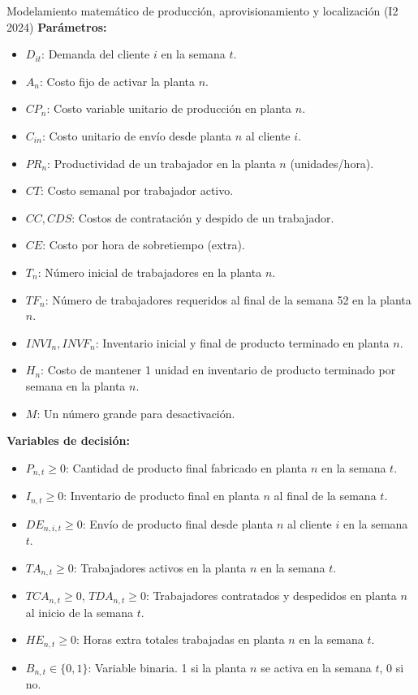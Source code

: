 \begin{ejercicio}{Modelamiento matemático de producción, aprovisionamiento y localización (I2 2024)}
\textbf{Parámetros:}
\begin{itemize}[leftmargin=1.4em, itemsep=0pt]
  \item $D_{it}$: Demanda del cliente $i$ en la semana $t$.
  \item $A_n$: Costo fijo de activar la planta $n$.
  \item $CP_n$: Costo variable unitario de producción en planta $n$.
  \item $C_{in}$: Costo unitario de envío desde planta $n$ al cliente $i$.
  \item $PR_n$: Productividad de un trabajador en la planta $n$ (unidades/hora).
  \item $CT$: Costo semanal por trabajador activo.
  \item $CC, CDS$: Costos de contratación y despido de un trabajador.
  \item $CE$: Costo por hora de sobretiempo (extra).
  \item $T_n$: Número inicial de trabajadores en la planta $n$.
  \item $TF_n$: Número de trabajadores requeridos al final de la semana 52 en la planta $n$.
  \item $INVI_n, INVF_n$: Inventario inicial y final de producto terminado en planta $n$.
  \item $H_n$: Costo de mantener 1 unidad en inventario de producto terminado por semana en la planta $n$.
  \item $M$: Un número grande para desactivación.
\end{itemize}

\textbf{Variables de decisión:}
\begin{itemize}[leftmargin=1.4em, itemsep=0pt]
  \item $P_{n,t} \ge 0$: Cantidad de producto final fabricado en planta $n$ en la semana $t$.
  \item $I_{n,t} \ge 0$: Inventario de producto final en planta $n$ al final de la semana $t$.
  \item $DE_{n,i,t} \ge 0$: Envío de producto final desde planta $n$ al cliente $i$ en la semana $t$.
  \item $TA_{n,t} \ge 0$: Trabajadores activos en la planta $n$ en la semana $t$.
  \item $TCA_{n,t} \ge 0$, $TDA_{n,t} \ge 0$: Trabajadores contratados y despedidos en planta $n$ al inicio de la semana $t$.
  \item $HE_{n,t} \ge 0$: Horas extra totales trabajadas en planta $n$ en la semana $t$.
  \item $B_{n,t} \in \{0, 1\}$: Variable binaria. 1 si la planta $n$ se activa en la semana $t$, 0 si no.
\end{itemize}


\end{ejercicio}
